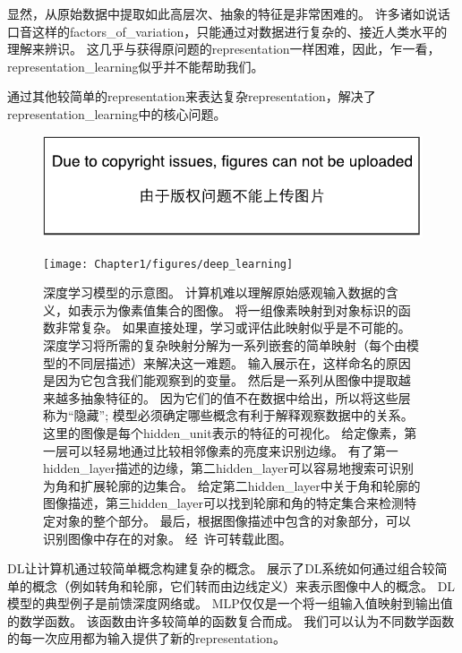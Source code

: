 显然，从原始数据中提取如此高层次、抽象的特征是非常困难的。
许多诸如说话口音这样的\gls{factors_of_variation}，只能通过对数据进行复杂的、接近人类水平的理解来辨识。
这几乎与获得原问题的\gls{representation}一样困难，因此，乍一看，\gls{representation_learning}似乎并不能帮助我们。

通过其他较简单的\gls{representation}来表达复杂\gls{representation}，解决了\gls{representation_learning}中的核心问题。

\begin{figure}[!htb]
\ifOpenSource
\centerline{\includegraphics{figure.pdf}}
\else
\centerline{\texttt{[image: Chapter1/figures/deep\_learning]}}
\fi
\caption{深度学习模型的示意图。 计算机难以理解原始感观输入数据的含义，如表示为像素值集合的图像。
将一组像素映射到对象标识的函数非常复杂。
如果直接处理，学习或评估此映射似乎是不可能的。
深度学习将所需的复杂映射分解为一系列嵌套的简单映射（每个由模型的不同层描述）来解决这一难题。
输入展示在，这样命名的原因是因为它包含我们能观察到的变量。
然后是一系列从图像中提取越来越多抽象特征的。
因为它们的值不在数据中给出，所以将这些层称为``隐藏''; 模型必须确定哪些概念有利于解释观察数据中的关系。
这里的图像是每个\gls{hidden_unit}表示的特征的可视化。
给定像素，第一层可以轻易地通过比较相邻像素的亮度来识别边缘。
有了第一\gls{hidden_layer}描述的边缘，第二\gls{hidden_layer}可以容易地搜索可识别为角和扩展轮廓的边集合。
给定第二\gls{hidden_layer}中关于角和轮廓的图像描述，第三\gls{hidden_layer}可以找到轮廓和角的特定集合来检测特定对象的整个部分。
最后，根据图像描述中包含的对象部分，可以识别图像中存在的对象。
经~\citet{ZeilerFergus14}许可转载此图。
}
\label{fig:chap1_deep_learning}
\end{figure}

\gls{DL}让计算机通过较简单概念构建复杂的概念。
展示了\gls{DL}系统如何通过组合较简单的概念（例如转角和轮廓，它们转而由边线定义）来表示图像中人的概念。
\gls{DL}模型的典型例子是前馈深度网络或。
\gls{MLP}仅仅是一个将一组输入值映射到输出值的数学函数。
该函数由许多较简单的函数复合而成。
我们可以认为不同数学函数的每一次应用都为输入提供了新的\gls{representation}。

